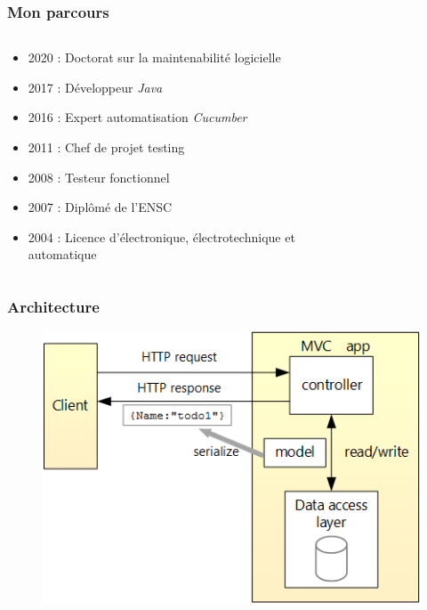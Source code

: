 \begin{frame}
    \frametitle{Mon parcours}

    \begin{columns}
        \begin{column}{0.6\textwidth}
            \begin{itemize}
                \item 2020 : Doctorat sur la maintenabilité logicielle
                \item 2017 : Développeur \emph{Java}
                \item 2016 : Expert automatisation \emph{Cucumber}
                \item 2011 : Chef de projet testing
                \item 2008 : Testeur fonctionnel
                \item 2007 : Diplômé de l'ENSC
                \item 2004 : Licence d'électronique, électrotechnique et automatique
            \end{itemize}
        \end{column}

        \begin{column}{0.4\textwidth}
            \begin{figure}
                \centering
                
                \label{fig:code-graph}
            \end{figure}
        \end{column}
    \end{columns}
\end{frame}

\begin{frame}
    \frametitle{Architecture}

    \begin{figure}
        \centering
        \includegraphics[height=0.5\linewidth]{figures/introduction/architecture}
        \label{fig:architexture}
    \end{figure}
\end{frame}

